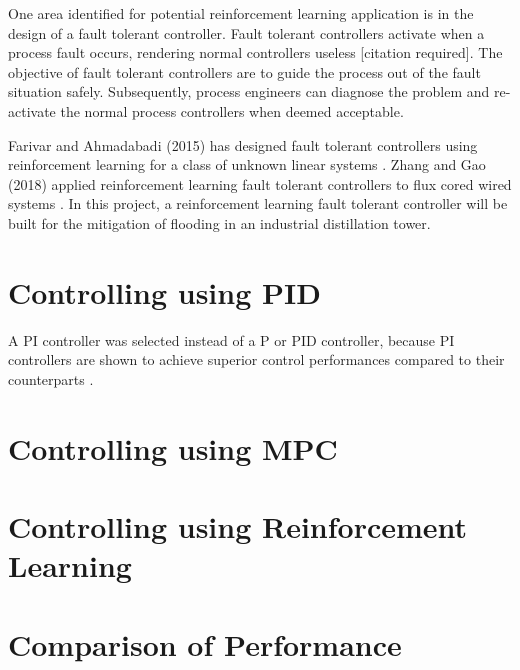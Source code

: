 One area identified for potential reinforcement learning application is in the design of a fault tolerant controller.  Fault tolerant controllers activate when a process fault occurs, rendering normal controllers useless [citation required]. The objective of fault tolerant controllers are to guide the process out of the fault situation safely.  Subsequently, process engineers can diagnose the problem and re-activate the normal process controllers when deemed acceptable.  

Farivar and Ahmadabadi (2015) has designed fault tolerant controllers using reinforcement learning for a class of unknown linear systems \cite{ahmad}.  Zhang and Gao (2018) applied reinforcement learning fault tolerant controllers to flux cored wired systems \cite{zhang_gao}.  In this project, a reinforcement learning fault tolerant controller will be built for the mitigation of flooding in an industrial distillation tower. 

\section{Controlling using PID}
A PI controller was selected instead of a P or PID controller, because PI controllers are shown to achieve superior control performances compared to their counterparts \cite{PI_controller}.

\section{Controlling using MPC}
\section{Controlling using Reinforcement Learning}
\section{Comparison of Performance}
